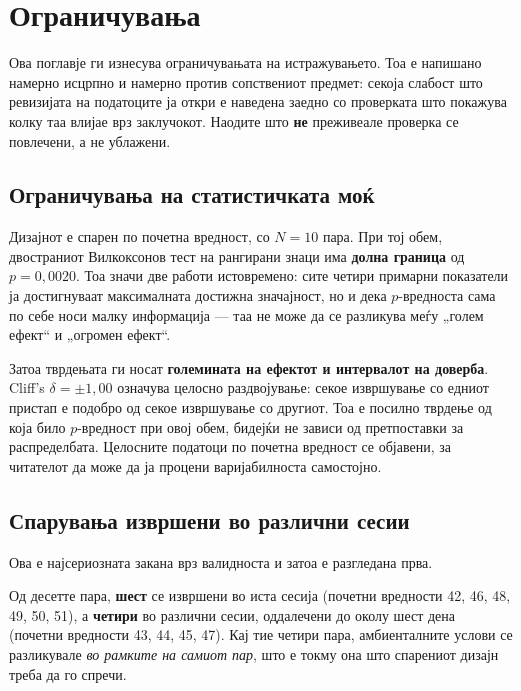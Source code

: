 \chapter{Ограничувања}
\label{chap:limitations}

Ова поглавје ги изнесува ограничувањата на истражувањето. Тоа е напишано намерно исцрпно и
намерно против сопствениот предмет: секоја слабост што ревизијата на податоците ја откри е
наведена заедно со проверката што покажува колку таа влијае врз заклучокот. Наодите што
\textbf{не} преживеале проверка се повлечени, а не ублажени.

\section{Ограничувања на статистичката моќ}

Дизајнот е спарен по почетна вредност, со $N = 10$ пара. При тој обем, двостраниот
Вилкоксонов тест на рангирани знаци има \textbf{долна граница} од $p = 0{,}0020$. Тоа значи две
работи истовремено: сите четири примарни показатели ја достигнуваат максималната достижна
значајност, но и дека $p$-вредноста сама по себе носи малку информација --- таа не може да
се разликува меѓу „голем ефект“ и „огромен ефект“.

Затоа тврдењата ги носат \textbf{големината на ефектот и интервалот на доверба}. Cliff's
$\delta = \pm 1{,}00$ означува целосно раздвојување: секое извршување со едниот пристап е
подобро од секое извршување со другиот. Тоа е посилно тврдење од која било $p$-вредност при
овој обем, бидејќи не зависи од претпоставки за распределбата. Целосните податоци по
почетна вредност се објавени, за читателот да може да ја процени варијабилноста самостојно.

\section{Спарувања извршени во различни сесии}

Ова е најсериозната закана врз валидноста и затоа е разгледана прва.

Од десетте пара, \textbf{шест} се извршени во иста сесија (почетни вредности 42, 46, 48, 49, 50,
51), а \textbf{четири} во различни сесии, оддалечени до околу шест дена (почетни вредности 43,
44, 45, 47). Кај тие четири пара, амбиенталните услови се разликувале \emph{во рамките на самиот
пар}, што е токму она што спарениот дизајн треба да го спречи.

